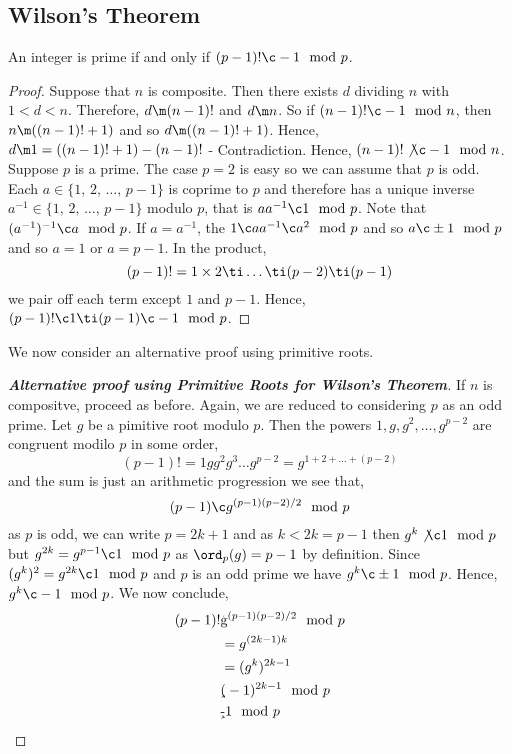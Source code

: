 \subsection{Wilson's Theorem}
\begin{nthm}
  An integer is prime if and only if $(p - 1)! \c -1 \mod p$.
\end{nthm}
\begin{proof}
  Suppose that $n$ is composite. Then there exists $d$ dividing $n$ with $1 < d < n$. Therefore, $d \m (n - 1)!$ and $d \m n$. So if $(n - 1)! \c -1 \mod n$, then $n \m ((n-1)! + 1)$ and so $d \m ((n - 1)! + 1)$. Hence, $d \m 1 = ((n - 1)! + 1) - (n - 1)!$ - Contradiction. Hence, $(n - 1)! \not\c -1 \mod n$.\\

  Suppose $p$ is a prime. The case $p = 2$ is easy so we can assume that $p$ is odd. Each $a \in \{1,\,2,\,\dots,\,p-1\}$ is coprime to $p$ and therefore has a unique inverse $a^{-1} \in \{1,\,2,\,\dots,\,p-1\}$ modulo $p$, that is $aa^{-1} \c 1 \mod p$.
  Note that $(a^{-1})^{-1}\c a \mod p$. If $a = a^{-1}$, the $1 \c aa^{-1} \c a^2 \mod p$ and so $a \c \pm 1 \mod p$ and so $a = 1$ or $a = p - 1$. In the product,
  $$ (p - 1)! = 1 \times 2 \ti \dots \ti (p - 2) \ti (p - 1) $$
  we pair off each term except $1$ and $p - 1$. Hence, $(p - 1)! \c 1 \ti (p - 1) \c -1 \mod p$.
\end{proof}

We now consider an alternative proof using primitive roots.

\begin{proof}[\textbf{Alternative proof using Primitive Roots for Wilson's Theorem}]
  If $n$ is compositve, proceed as before. Again, we are reduced to considering $p$ as an odd prime. Let $g$ be a pimitive root modulo $p$. Then the powers $1, g, g^2, \dots, g^{p-2}$ are congruent modilo $p$ in some order,
  $$ (p - 1)! = 1gg^{2}g^3\dots g^{p-2} = g ^{1 + 2 + \dots + (p-2)} $$
  and the sum is just an arithmetic progression we see that,
  $$ (p - 1) \c g^{(p-1)(p-2)/2}\mod p $$
  as $p$ is odd, we can write $p = 2k +1$ and as $k < 2k = p-1$ then $g^k \not\c 1 \mod p$ but $g^{2k} = g^{p-1} \c 1 \mod p$ as $\ord_p(g) = p - 1$ by definition. Since $(g^k)^2 = g^{2k} \c 1 \mod p$ and $p$ is an odd prime we have $g^k \c \pm 1 \mod p$. Hence, $g^k \c -1 \mod p$. We now conclude,
  \begin{align*}
    (p - 1)! &\c g^{(p-1)(p-2)/2} \mod p\\
    &= g^{(2k - 1)k}\\
    &= (g^k)^{2k-1}\\
    &\c (-1)^{2k-1} \mod p \\
    &\c -1 \mod p
  \end{align*}
\end{proof}
